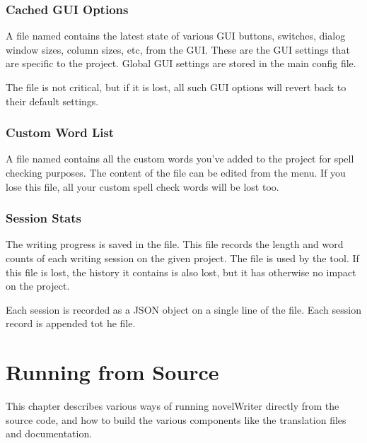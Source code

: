 \documentclass[a4paper,11pt,english]{sphinxmanual}
\begin{document}
\subsection{Cached GUI Options}
\label{\detokenize{tech_storage:cached-gui-options}}
\sphinxAtStartPar
A file named  contains the latest state of various GUI buttons, switches,
dialog window sizes, column sizes, etc, from the GUI. These are the GUI settings that are specific
to the project. Global GUI settings are stored in the main config file.

\sphinxAtStartPar
The file is not critical, but if it is lost, all such GUI options will revert back to their default
settings.


\subsection{Custom Word List}
\label{\detokenize{tech_storage:custom-word-list}}
\sphinxAtStartPar
A file named  contains all the custom words you’ve added to the project for
spell checking purposes. The content of the file can be edited from the  menu. If you lose
this file, all your custom spell check words will be lost too.


\subsection{Session Stats}
\label{\detokenize{tech_storage:session-stats}}
\sphinxAtStartPar
The writing progress is saved in the  file. This file records the length
and word counts of each writing session on the given project. The file is used by the  tool. If this file is lost, the history it contains is also lost, but it has otherwise
no impact on the project.

\sphinxAtStartPar
Each session is recorded as a JSON object on a single line of the file. Each session record is
appended tot he file.

\sphinxstepscope


\chapter{Running from Source}
\label{\detokenize{tech_source:running-from-source}}\label{\detokenize{tech_source:a-source}}\label{\detokenize{tech_source::doc}}
\sphinxAtStartPar
This chapter describes various ways of running novelWriter directly from the source code, and how
to build the various components like the translation files and documentation.
\end{document}
